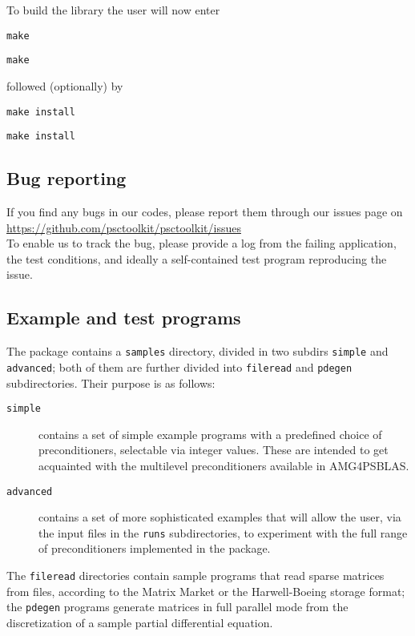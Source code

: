 To build the library the user will now enter
\ifpdf
\begin{verbatim}
make
\end{verbatim}
\else
\begin{verbatim}
make
\end{verbatim}
\fi
followed (optionally) by
\ifpdf
\begin{verbatim}
make install
\end{verbatim}
\else
\begin{verbatim}
make install
\end{verbatim}
\fi
\subsection{Bug reporting}
If you find any bugs in our codes, please report them through our
issues page on \\[2mm]
\url{https://github.com/psctoolkit/psctoolkit/issues}\\

To enable us to track the bug, please provide a log from the failing
application, the test conditions, and ideally a self-contained test
program reproducing the issue.

\subsection{Example and test programs\label{sec:ex_and_test}}
The package contains a \verb|samples| directory, divided in two
subdirs  \verb|simple| and \verb|advanced|;
both of them are further divided into \verb|fileread| and
\verb|pdegen| subdirectories. Their purpose is as follows:
\begin{description}
\item[\tt simple] contains a set of simple example programs with a
  predefined choice of preconditioners, selectable via integer
  values. These are intended to get  acquainted with the
  multilevel preconditioners available in AMG4PSBLAS.
\item[\tt advanced] contains a set of more sophisticated examples that
  will allow the user, via the input files in the \verb|runs|
  subdirectories, to experiment with the full range of preconditioners
  implemented in the package.
\end{description}
The \verb|fileread| directories contain sample programs that read
sparse matrices from files, according to the Matrix Market or the
Harwell-Boeing storage format; the \verb|pdegen| programs generate
matrices in full parallel mode from the discretization of a sample partial
differential equation.
